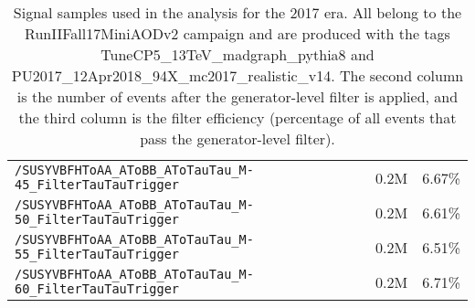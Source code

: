\begin{table}[ht]
\begin{center}
{\begin{tabular}{|l|c|c|}
    \texttt{/SUSYVBFHToAA\_AToBB\_AToTauTau\_M-45\_FilterTauTauTrigger} & 0.2M & 6.67\%\\
    \texttt{/SUSYVBFHToAA\_AToBB\_AToTauTau\_M-50\_FilterTauTauTrigger} & 0.2M & 6.61\%\\
    \texttt{/SUSYVBFHToAA\_AToBB\_AToTauTau\_M-55\_FilterTauTauTrigger} & 0.2M & 6.51\%\\
    \texttt{/SUSYVBFHToAA\_AToBB\_AToTauTau\_M-60\_FilterTauTauTrigger} & 0.2M & 6.71\%\\
    \hline
    \end{tabular}
    }
    \end{center}
    \caption{Signal samples used in the analysis for the 2017 era. All belong to the RunIIFall17MiniAODv2 campaign and are produced with the tags TuneCP5\_13TeV\_madgraph\_pythia8 and PU2017\_12Apr2018\_94X\_mc2017\_realistic\_v14. The second column is the number of events after the generator-level filter is applied, and the third column is the filter efficiency (percentage of all events that pass the generator-level filter).}
    \label{tab:2017signal}
    \end{table}
    
